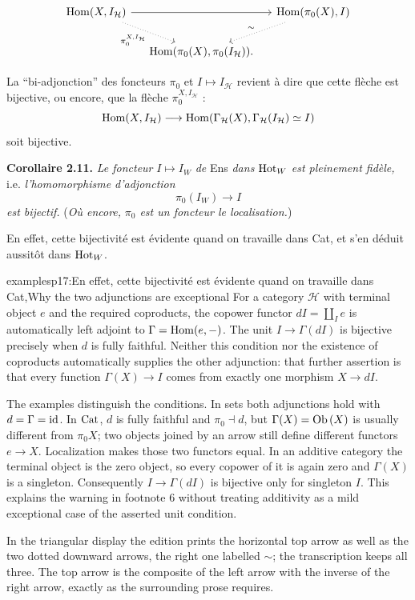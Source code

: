 
\[
\begin{tikzcd}[column sep=small]
\Hom(X,I_{\mathcal{H}}) \arrow[rr] \arrow[dr,dotted,"\pi_0^{X,I_{\mathcal{H}}}"'] & & \Hom(\pi_0(X),I) \arrow[dl,dotted,"\sim"'] \\ %
& \Hom(\pi_0(X),\pi_0(I_{\mathcal{H}})). &
\end{tikzcd}
\]

La “bi-adjonction” des foncteurs $\pi_0$ et $I\longmapsto I_{\mathcal{H}}$ revient à dire que cette flèche est bijective,
ou encore, que la flèche $\pi_0^{X,I_{\mathcal{H}}}$ :
\[
\operatorname{Hom}(X,I_{\mathcal{H}})\longrightarrow\operatorname{Hom}(\Gamma_{\mathcal{H}}(X),\Gamma_{\mathcal{H}}(I_{\mathcal{H}})\simeq I)
\]
soit bijective.

\textbf{Corollaire 2.11.} \textit{Le foncteur} $I\longmapsto I_W$ \textit{de} Ens \textit{dans} $\mathrm{Hot}_W$ \textit{est pleinement fidèle,} i.e. \textit{l'homomorphisme d'adjonction}
\[
\pi_0(I_W)\longrightarrow I
\]
\textit{est bijectif.} (\textit{Où encore,} %
\textit{$\pi_0$ est un foncteur le localisation.}) %

En effet, cette bijectivité est évidente quand on travaille dans Cat, et s'en déduit aussitôt dans $\mathrm{Hot}_W$.

\begin{dcomment}{examples}{p17:En effet, cette bijectivité est évidente quand on travaille dans Cat,}{Why the two adjunctions are exceptional}
For a category $\mathcal H$ with terminal object $e$ and the required coproducts, the copower functor $dI=\coprod_I e$ is automatically left adjoint to $\Gamma=\operatorname{Hom}(e,-)$. The unit $I\to\Gamma(dI)$ is bijective precisely when $d$ is fully faithful. Neither this condition nor the existence of coproducts automatically supplies the other adjunction: that further assertion is that every function $\Gamma(X)\to I$ comes from exactly one morphism $X\to dI$.

The examples distinguish the conditions. In sets both adjunctions hold with $d=\Gamma=\mathrm{id}$. In $\mathrm{Cat}$, $d$ is fully faithful and $\pi_0\dashv d$, but $\Gamma(X)=\mathrm{Ob}\,(X)$ is usually different from $\pi_0X$; two objects joined by an arrow still define different functors $e\to X$. Localization makes those two functors equal. In an additive category the terminal object is the zero object, so every copower of it is again zero and $\Gamma(X)$ is a singleton. Consequently $I\to\Gamma(dI)$ is bijective only for singleton $I$. This explains the warning in footnote 6 without treating additivity as a mild exceptional case of the asserted unit condition.

In the triangular display the edition prints the horizontal top arrow as well as the two dotted downward arrows, the right one labelled $\sim$; the transcription keeps all three. The top arrow is the composite of the left arrow with the inverse of the right arrow, exactly as the surrounding prose requires.
\end{dcomment}


